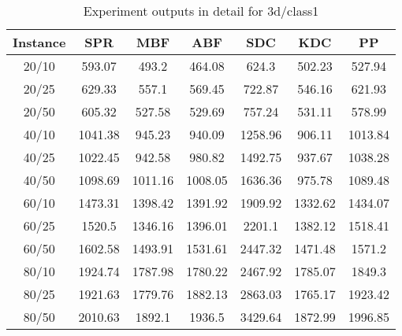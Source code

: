 \begin{table}[ht!]
    \caption{Experiment outputs in detail for 3d/class1}
    \centering
    \begin{tabular}{@{}ccccccc@{}}
        \toprule
        {\bfseries Instance} & {\bfseries SPR} & {\bfseries MBF}
        & {\bfseries ABF} & {\bfseries SDC} & {\bfseries KDC} & {\bfseries PP}\\
        \midrule
        20/10 & 593.07 & 493.2 & 464.08 & 624.3 & 502.23 & 527.94\\
        20/25 & 629.33 & 557.1 & 569.45 & 722.87 & 546.16 & 621.93\\
        20/50 & 605.32 & 527.58 & 529.69 & 757.24 & 531.11 & 578.99\\
        40/10 & 1041.38 & 945.23 & 940.09 & 1258.96 & 906.11 & 1013.84\\
        40/25 & 1022.45 & 942.58 & 980.82 & 1492.75 & 937.67 & 1038.28\\
        40/50 & 1098.69 & 1011.16 & 1008.05 & 1636.36 & 975.78 & 1089.48\\
        60/10 & 1473.31 & 1398.42 & 1391.92 & 1909.92 & 1332.62 & 1434.07\\
        60/25 & 1520.5 & 1346.16 & 1396.01 & 2201.1 & 1382.12 & 1518.41\\
        60/50 & 1602.58 & 1493.91 & 1531.61 & 2447.32 & 1471.48 & 1571.2\\
        80/10 & 1924.74 & 1787.98 & 1780.22 & 2467.92 & 1785.07 & 1849.3\\
        80/25 & 1921.63 & 1779.76 & 1882.13 & 2863.03 & 1765.17 & 1923.42\\
        80/50 & 2010.63 & 1892.1 & 1936.5 & 3429.64 & 1872.99 & 1996.85\\
        \bottomrule
    \end{tabular}
\end{table}